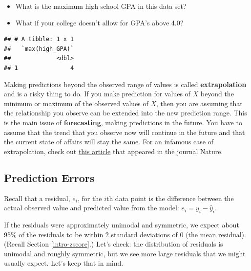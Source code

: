 \documentclass[
]{book}
\newenvironment{Shaded}{\begin{snugshade}}{\end{snugshade}}
\newcommand{\CommentTok}[1]{\textcolor[rgb]{0.56,0.35,0.01}{\textit{#1}}}
\newcommand{\KeywordTok}[1]{\textcolor[rgb]{0.13,0.29,0.53}{\textbf{#1}}}
\newcommand{\NormalTok}[1]{#1}
\newcommand{\OperatorTok}[1]{\textcolor[rgb]{0.81,0.36,0.00}{\textbf{#1}}}
\newcommand{\StringTok}[1]{\textcolor[rgb]{0.31,0.60,0.02}{#1}}
\providecommand{\tightlist}{%
  \setlength{\itemsep}{0pt}\setlength{\parskip}{0pt}}
\begin{document}
\begin{itemize}
\tightlist
\item
  What is the maximum high school GPA in this data set?
\item
  What if your college doesn't allow for GPA's above 4.0?
\end{itemize}

\begin{Shaded}
\end{Shaded}

\begin{verbatim}
## # A tibble: 1 x 1
##   `max(high_GPA)`
##             <dbl>
## 1               4
\end{verbatim}

Making predictions beyond the observed range of values is called \textbf{extrapolation} and is a risky thing to do. If you make prediction for values of \(X\) beyond the minimum or maximum of the observed values of \(X\), then you are assuming that the relationship you observe can be extended into the new prediction range. This is the main issue of \textbf{forecasting}, making predictions in the future. You have to assume that the trend that you observe now will continue in the future and that the current state of affairs will stay the same. For an infamous case of extrapolation, check out \href{https://www.ncbi.nlm.nih.gov/pmc/articles/PMC3173856/}{this article} that appeared in the journal Nature.

\hypertarget{prediction-errors}{%
\subsection{Prediction Errors}\label{prediction-errors}}

Recall that a residual, \(e_i\), for the \(i\)th data point is the difference between the actual observed value and predicted value from the model: \(e_i = y_i - \hat{y}_i\).

If the residuals were approximately unimodal and symmetric, we expect about 95\% of the residuals to be within 2 standard deviations of 0 (the mean residual). (Recall Section \ref{intro-zscore}.) Let's check: the distribution of residuals is unimodal and roughly symmetric, but we see more large residuals that we might usually expect. Let's keep that in mind.
\end{document}
